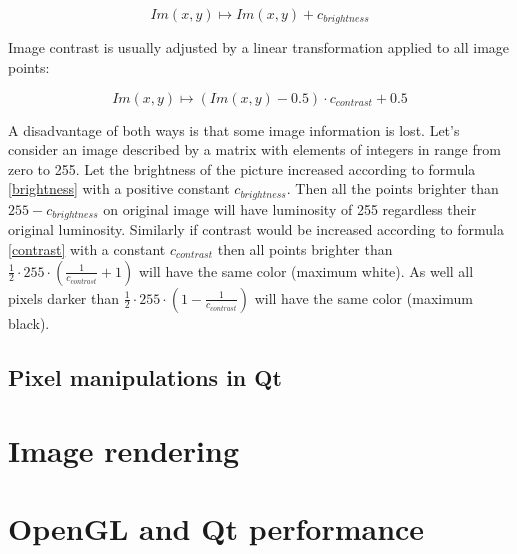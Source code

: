 \begin{equation}
\label{brightness}
  Im(x,y) \longmapsto Im(x,y) + c_{brightness} 
\end{equation}

Image contrast is usually adjusted by a linear transformation applied to all image points:

\begin{equation}
\label{contrast}
  Im(x,y) \longmapsto   (Im(x,y) - 0.5) \cdot c_{contrast} + 0.5
\end{equation}

A disadvantage of both ways is that some image information is lost. Let's consider an image described by a matrix with elements of integers in range from zero to 255. Let the brightness of the picture increased according to formula \eqref{brightness} with a positive constant $ c_{brightness} $. Then all the points brighter than $ 255 - c_{brightness} $ on original image will have luminosity of 255 regardless their original luminosity. Similarly if contrast would be increased according to formula \eqref{contrast} with a constant $ c_{contrast} $ then all points brighter than $ \frac{1}{2} \cdot 255 \cdot (\frac{1}{c_{contrast}}+1) $ will have the same color (maximum white). As well all pixels darker than $ \frac{1}{2} \cdot 255 \cdot (1 - \frac{1}{c_{contrast}}) $ will have the same color (maximum black).


\subsection{Pixel manipulations in Qt}



\section{Image rendering}



\section{OpenGL and Qt performance}

